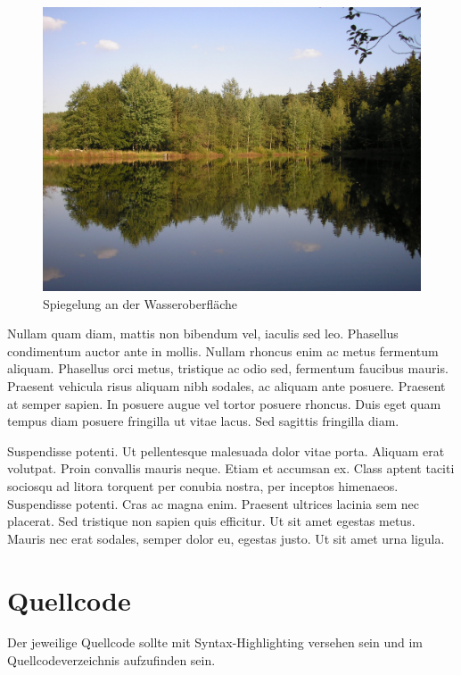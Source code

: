\begin{figure}
	\includegraphics[width=\linewidth]{content/xx_test/Kleiner_Streichteich_Ilmenau.JPG}
	\caption{Spiegelung an der Wasseroberfläche \cite{TestCitation022}}
\end{figure}

Nullam quam diam, mattis non bibendum vel, iaculis sed leo. Phasellus condimentum auctor ante in mollis. Nullam rhoncus enim ac metus fermentum aliquam. Phasellus orci metus, tristique ac odio sed, fermentum faucibus mauris. Praesent vehicula risus aliquam nibh sodales, ac aliquam ante posuere. Praesent at semper sapien. In posuere augue vel tortor posuere rhoncus. Duis eget quam tempus diam posuere fringilla ut vitae lacus. Sed sagittis fringilla diam.

Suspendisse potenti. Ut pellentesque malesuada dolor vitae porta. Aliquam erat volutpat. Proin convallis mauris neque. Etiam et accumsan ex. Class aptent taciti sociosqu ad litora torquent per conubia nostra, per inceptos himenaeos. Suspendisse potenti. Cras ac magna enim. Praesent ultrices lacinia sem nec placerat. Sed tristique non sapien quis efficitur. Ut sit amet egestas metus. Mauris nec erat sodales, semper dolor eu, egestas justo. Ut sit amet urna ligula.

\section{Quellcode}

Der jeweilige Quellcode sollte mit Syntax-Highlighting versehen sein und im Quellcodeverzeichnis aufzufinden sein.


